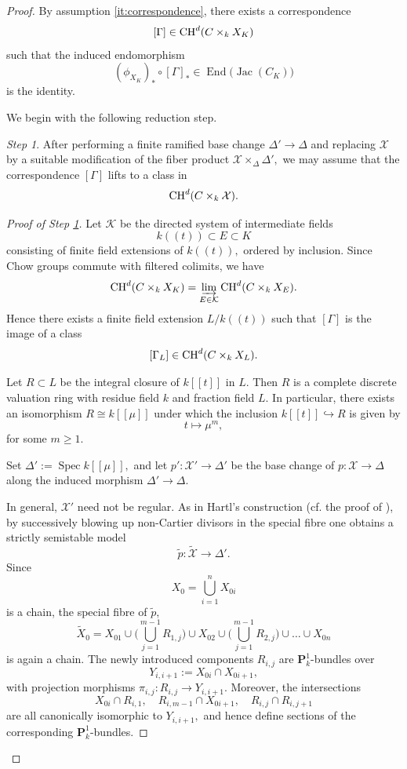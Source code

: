 \documentclass[11pt,letterpaper]{amsart}
\newcommand{\CH}{\textnormal{CH}}
\newcommand{\ca}[1]{{\mathcal{#1}}}
\numberwithin{equation}{section}
\theoremstyle{definition}
\theoremstyle{remark}
\newtheorem{step}{Step}
\newcommand{\bbP}{\mathbf{P}}
\DeclareMathOperator{\End}{End}
\DeclareMathOperator{\Spec}{Spec}
\DeclareMathOperator{\jac}{Jac}
\begin{document}
\begin{proof}
By assumption \eqref{it:correspondence}, there exists a correspondence $$[\Gamma]\in\CH^{d}(C\times_{k}X_{K})$$
such that the induced endomorphism $$(\phi_{X_{K}})_{\ast}\circ [\Gamma]_{\ast}\in\End\bigl(\jac(C_{K})\bigr)$$
is the identity.\par
We begin with the following reduction step.
\begin{step}\label{step:reduction} 
After performing a finite ramified base change $\Delta' \to \Delta$ and replacing $\ca X$ by a suitable modification of the fiber product $\ca X \times_{\Delta} \Delta',$
we may assume that the correspondence $[\Gamma]$ lifts to a class in
$$
\CH^{d}(C\times_{k}\mathcal{X}).
$$
\begin{proof}[Proof of Step \ref{step:reduction}] Let $\mathcal{K}$ be the directed system of intermediate fields $$k((t))\subset E\subset K $$ consisting of finite field extensions of $k((t)),$ ordered by inclusion. Since Chow groups commute with filtered colimits, we have $$\CH^{d}(C\times_{k}X_{K})=\varinjlim_{E\in\mathcal{K}}\CH^{d}(C\times_{k}X_{E}).$$ Hence there exists a finite field extension $L/k((t))$ such that $[\Gamma]$ is the image of a class $$[\Gamma_{L}]\in\CH^{d}(C\times_{k}X_{L}).$$ \par

Let $R\subset L$ be the integral closure of $k[[t]]$ in $L$. Then $R$ is a complete discrete valuation ring with residue field $k$ and fraction field $L.$ In particular, there exists an isomorphism $R\cong k[[\mu]]$ under which the inclusion $k[[t]] \hookrightarrow R$ is given by $$t \longmapsto \mu^m,$$ for some $m\geq1.$\par
Set $\Delta':=\Spec k[[\mu]],$ and let $p'\colon\mathcal{X}'\to\Delta'$ be the base change of $p\colon\mathcal{X}\to\Delta$ along the induced morphism $\Delta'\to\Delta$.\par
In general, $\mathcal{X}'$ need not be regular. As in Hartl's construction (cf. the proof of \cite[Proposition 2.2]{Hartl2001SemistabilityAB}), by successively blowing up non-Cartier divisors in the special fibre one obtains a strictly semistable model $$\widetilde{p}\colon\widetilde{\mathcal{X}}\longrightarrow\Delta'.$$ Since $$X_{0}=\bigcup_{i=1}^{n}X_{0i}$$ is a chain, the special fibre of $\widetilde{p},$ \begin{equation*}\widetilde{X}_{0}=X_{01}\cup \bigl(\bigcup_{j=1}^{m-1}R_{1,j}\bigr)\cup X_{02}\cup \bigl(\bigcup_{j=1}^{m-1}R_{2,j}\bigr)\cup \dots\cup X_{0n}\end{equation*} is again a chain. The newly introduced components $R_{i,j}$ are $\bbP^{1}_{k}$-bundles over $$Y_{i,i+1}:=X_{0i}\cap X_{0i+1},$$ with projection morphisms $\pi_{i,j}\colon R_{i,j}\to Y_{i,i+1}$. Moreover, the intersections $$X_{0i}\cap R_{i,1}, \quad R_{i,m-1}\cap X_{0i+1}, \quad R_{i,j}\cap R_{i,j+1}$$ are all canonically isomorphic to $Y_{i,i+1},$ and hence define sections of the corresponding $\bbP^{1}_{k}$-bundles.


\end{proof}
\end{step}
\end{proof}
\end{document}
